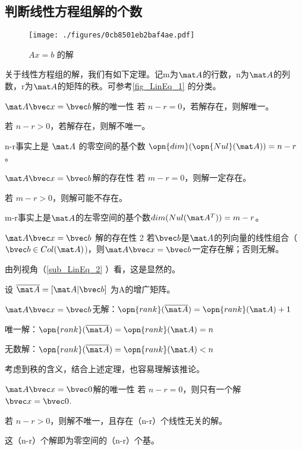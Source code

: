 \subsection{判断线性方程组解的个数}
\begin{figure}[ht]
\centering
\texttt{[image: ./figures/0cb8501eb2baf4ae.pdf]}
\caption{$Ax=b$ 的解} \label{fig_LinEq_1}
\end{figure}


关于线性方程组的解，我们有如下定理。记m为$\mat A$的行数，n为$\mat A$的列数，r为$\mat A$的矩阵的秩。可参考\autoref{fig_LinEq_1} 的分类。

\begin{theorem}{$\mat A \bvec x=\bvec b$解的唯一性}
若 $n-r=0$，若解存在，则解唯一。

若 $n-r>0$，若解存在，则解不唯一。
\end{theorem}
n-r事实上是 $\mat A$ 的零空间的基个数 $\opn{dim}(\opn{Nul}(\mat A))=n-r$。

\begin{theorem}{$\mat A \bvec x=\bvec b$解的存在性}
若 $m-r=0$，则解一定存在。

若 $m-r>0$，则解可能不存在。
\end{theorem}
m-r事实上是$\mat A$的左零空间的基个数$dim(Nul(\mat A^T))=m-r$。

\begin{theorem}{$\mat A \bvec x=\bvec b$ 解的存在性 2}
若$\bvec b$是$\mat A$的列向量的线性组合（$\bvec b \in Col(\mat A)$)，则$\mat A \bvec x=\bvec b$一定存在解；否则无解。
\end{theorem}
由列视角（\autoref{sub_LinEq_2} ）看，这是显然的。

\begin{corollary}{}
设 $\overline{\mat A} = [\mat A | \bvec b] $ 为A的增广矩阵。

$\mat A \bvec x=\bvec b$无解：$\opn{rank}(\overline{\mat A})=\opn{rank}(\mat A)+1$

唯一解：$\opn{rank}(\overline{\mat A})=\opn{rank}(\mat A)=n$

无数解：$\opn{rank}(\overline{\mat A})=\opn{rank}(\mat A)<n$
\end{corollary}
考虑到秩的含义，结合上述定理，也容易理解该推论。

\begin{theorem}{$\mat A \bvec x=\bvec 0$解的唯一性}
若 $n-r=0$，则只有一个解 $\bvec x = \bvec 0$.

若 $n-r>0$，则解不唯一，且存在（n-r）个线性无关的解。
\end{theorem}
这（n-r）个解即为零空间的（n-r）个基。


